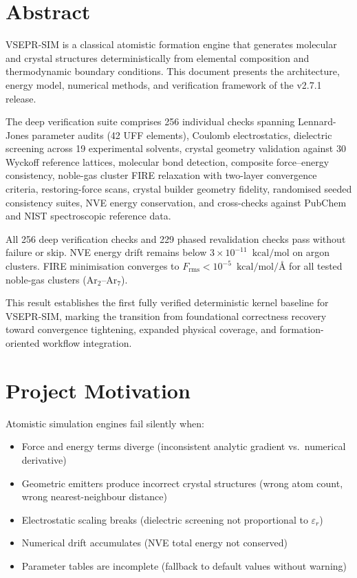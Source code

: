\documentclass[11pt,twoside]{article}
\newcommand{\Angstrom}{\text{\AA}}
\newcommand{\kcalmol}{\text{kcal/mol}}
\newcommand{\Frms}{F_{\mathrm{rms}}}
\begin{document}
\section{Abstract}

VSEPR-SIM is a classical atomistic formation engine that generates molecular
and crystal structures deterministically from elemental composition and
thermodynamic boundary conditions.  This document presents the architecture,
energy model, numerical methods, and verification framework of the v2.7.1
release.

The deep verification suite comprises 256 individual checks spanning
Lennard-Jones parameter audits (42 UFF elements), Coulomb electrostatics,
dielectric screening across 19 experimental solvents, crystal geometry
validation against 30 Wyckoff reference lattices, molecular bond detection,
composite force--energy consistency, noble-gas cluster FIRE relaxation with
two-layer convergence criteria, restoring-force scans, crystal builder
geometry fidelity, randomised seeded consistency suites, NVE energy
conservation, and cross-checks against PubChem and NIST spectroscopic
reference data.

All 256 deep verification checks and 229 phased revalidation checks pass
without failure or skip.  NVE energy drift remains below
$3 \times 10^{-11}$~$\kcalmol$ on argon clusters.  FIRE minimisation
converges to $\Frms < 10^{-5}$~$\kcalmol/\Angstrom$ for all tested
noble-gas clusters (Ar$_2$--Ar$_7$).

This result establishes the first fully verified deterministic kernel
baseline for VSEPR-SIM, marking the transition from foundational
correctness recovery toward convergence tightening, expanded physical
coverage, and formation-oriented workflow integration.


\section{Project Motivation}
\label{sec:motivation}

Atomistic simulation engines fail silently when:
\begin{itemize}
  \item Force and energy terms diverge (inconsistent analytic gradient
        vs.\ numerical derivative)
  \item Geometric emitters produce incorrect crystal structures
        (wrong atom count, wrong nearest-neighbour distance)
  \item Electrostatic scaling breaks (dielectric screening not proportional
        to $\varepsilon_r$)
  \item Numerical drift accumulates (NVE total energy not conserved)
  \item Parameter tables are incomplete (fallback to default values without
        warning)
\end{itemize}
\end{document}
